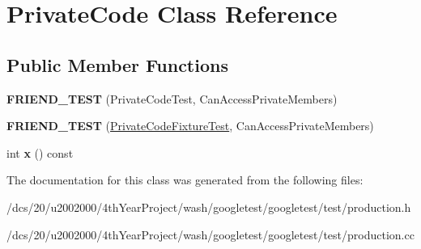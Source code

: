 \hypertarget{classPrivateCode}{}\section{Private\+Code Class Reference}
\label{classPrivateCode}
\subsection*{Public Member Functions}
\begin{DoxyCompactItemize}
\item 
\mbox{\label{classPrivateCode_a9a74a333501232539ab1636f0928d8f2}} 
{\bfseries F\+R\+I\+E\+N\+D\+\_\+\+T\+E\+ST} (Private\+Code\+Test, Can\+Access\+Private\+Members)
\item 
\mbox{\label{classPrivateCode_a29b6823300f68d78691476eeeaed8a7c}} 
{\bfseries F\+R\+I\+E\+N\+D\+\_\+\+T\+E\+ST} (\mbox{\hyperlink{classtesting_1_1Test}{Private\+Code\+Fixture\+Test}}, Can\+Access\+Private\+Members)
\item 
\mbox{\label{classPrivateCode_a247781246ce4d0c66563eaa39ba5aaa9}} 
int {\bfseries x} () const
\end{DoxyCompactItemize}


The documentation for this class was generated from the following files\+:\begin{DoxyCompactItemize}
\item 
/dcs/20/u2002000/4th\+Year\+Project/wash/googletest/googletest/test/production.\+h\item 
/dcs/20/u2002000/4th\+Year\+Project/wash/googletest/googletest/test/production.\+cc\end{DoxyCompactItemize}
